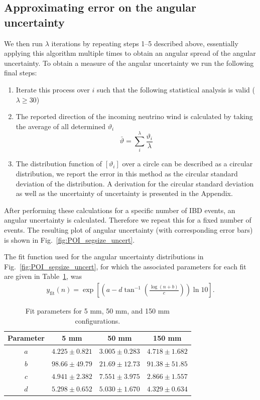\documentclass[tightenlines,twocolumn,prl,notitlepage,nofootinbib,preprintnumbers,longbibliography]{revtex4-1}
\begin{document}
\subsection{Approximating error on the angular uncertainty}

We then run $\lambda$ iterations by repeating steps 1--5 described above, essentially applying this algorithm multiple times to obtain an angular spread of the angular uncertainty. To obtain a measure of the angular uncertainty we run the following final steps:
\begin{enumerate}

    \item Iterate this process over $i$ such that the following statistical analysis is valid ($\lambda \geq 30$)
    \item The reported direction of the incoming neutrino wind is calculated by taking the average of all determined $\vartheta_i$
\[\bar\vartheta=\sum^\lambda_i\frac{\vartheta_i}{\lambda} \]
    
    \item The distribution function of $[\vartheta_i]$ over a circle can be described as a circular distribution, we report the error in this method as the circular standard deviation of the distribution. A derivation for the circular standard deviation as well as the uncertainty of uncertainty is presented in the Appendix.
\end{enumerate}


After performing these calculations for a specific number of IBD events, an angular uncertainty is calculated. Therefore we repeat this for a fixed number of events. The resulting plot of angular uncertainty (with corresponding error bars) is shown in Fig.~\ref{fig:POI_segsize_uncert}.

The fit function used for the angular uncertainty distributions in Fig.~\ref{fig:POI_segsize_uncert}, for which the associated parameters for each fit are given in Table~\ref{tab:fit_parameters}, was
\begin{align}
y_\mathrm{fit}(n)=\exp\left[\left(a-d\tan^{-1}{\left(\frac{\log{(n+b)}}{c}\right)}\right)\ln 10\right].
\end{align}

\begin{table}[h]
\centering
\begin{tabular}{c c c c}
\hline
Parameter & 5 mm & 50 mm & 150 mm \\
\hline
$a$ & $4.225 \pm 0.821$ 
    & $3.005 \pm 0.283$ 
    & $4.718 \pm 1.682$ \\

$b$ & $98.66 \pm 49.79$ 
    & $21.69 \pm 12.73$ 
    & $91.38 \pm 51.85$ \\

$c$ & $4.941 \pm 2.382$ 
    & $7.551 \pm 3.975$ 
    & $2.866 \pm 1.557$ \\

$d$ & $5.298 \pm 0.652$ 
    & $5.030 \pm 1.670$ 
    & $4.329 \pm 0.634$ \\
\hline
\end{tabular}
\caption{Fit parameters for 5 mm, 50 mm, and 150 mm configurations.}
\label{tab:fit_parameters}
\end{table}
\end{document}
